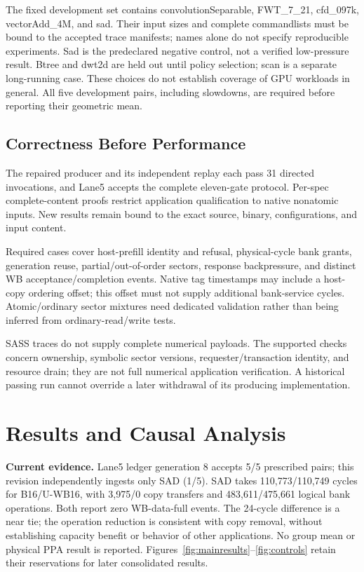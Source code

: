 \documentclass[conference,letterpaper]{IEEEtran}
\begin{document}
The fixed development set contains convolutionSeparable, FWT\_7\_21, cfd\_097k, vectorAdd\_4M, and sad. Their input sizes and complete commandlists must be bound to the accepted trace manifests; names alone do not specify reproducible experiments. Sad is the predeclared negative control, not a verified low-pressure result. Btree and dwt2d are held out until policy selection; scan is a separate long-running case. These choices do not establish coverage of GPU workloads in general. All five development pairs, including slowdowns, are required before reporting their geometric mean.

\subsection{Correctness Before Performance}
The repaired producer and its independent replay each pass 31 directed invocations, and Lane5 accepts the complete eleven-gate protocol. Per-spec complete-content proofs restrict application qualification to native nonatomic inputs. New results remain bound to the exact source, binary, configurations, and input content.

Required cases cover host-prefill identity and refusal, physical-cycle bank grants, generation reuse, partial/out-of-order sectors, response backpressure, and distinct WB acceptance/completion events. Native tag timestamps may include a host-copy ordering offset; this offset must not supply additional bank-service cycles. Atomic/ordinary sector mixtures need dedicated validation rather than being inferred from ordinary-read/write tests.

SASS traces do not supply complete numerical payloads. The supported checks concern ownership, symbolic sector versions, requester/transaction identity, and resource drain; they are not full numerical application verification. A historical passing run cannot override a later withdrawal of its producing implementation.

\section{Results and Causal Analysis}
\noindent\textbf{Current evidence.} Lane5 ledger generation 8 accepts 5/5 prescribed pairs; this revision independently ingests only SAD (1/5). SAD takes 110,773/110,749 cycles for B16/U-WB16, with 3,975/0 copy transfers and 483,611/475,661 logical bank operations. Both report zero WB-data-full events. The 24-cycle difference is a near tie; the operation reduction is consistent with copy removal, without establishing capacity benefit or behavior of other applications. No group mean or physical PPA result is reported. Figures~\ref{fig:mainresults}--\ref{fig:controls} retain their reservations for later consolidated results.
\end{document}
